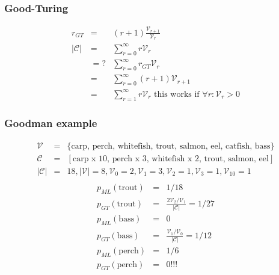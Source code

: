 \documentclass[ignorenonframetext]{beamer}
\newcommand{\vocab}{\mathcal{V}}
\newcommand{\corpus}{\mathcal{C}}
\begin{document}
\begin{frame}\frametitle{Good-Turing}
\begin{eqnarray*}
r_{GT} &=& (r+1)\frac{\vocab_{r+1}}{\vocab_{r}} \\
|\corpus| &=& \sum_{r=0}^\infty r\vocab_r \\
&=?& \sum_{r=0}^\infty r_{GT}\vocab_r \\
&=& \sum_{r=0}^\infty (r+1)\vocab_{r+1} \\
&=& \sum_{r=1}^\infty r \vocab_r  \mbox{  this works if  } \forall r : \vocab_r > 0
\end{eqnarray*}
\end{frame}

\begin{frame}\frametitle{Goodman example}
\begin{eqnarray*}
\vocab &=& \{ \mbox{carp, perch, whitefish, trout, salmon, eel,
  catfish, bass} \} \\
\corpus &=& [ \mbox{carp x 10, perch x 3, whitefish x 2, trout, salmon, eel} ] \\
|\corpus| &=& 18, |\vocab| = 8, \vocab_0=2, \vocab_1=3, \vocab_2=1, \vocab_3=1,
\vocab_{10}=1 \\
\end{eqnarray*}
\begin{eqnarray*}
p_{ML}(\mbox{trout}) &=& 1/18 \\
p_{GT}(\mbox{trout}) &=& \frac{2 \vocab_2 / \vocab_1}{|\corpus|} = 1/27 \\
p_{ML}(\mbox{bass}) &=& 0 \\
p_{GT}(\mbox{bass}) &=& \frac{ \vocab_1 / \vocab_0}{|\corpus|} = 1/12 \\
p_{ML}(\mbox{perch}) &=& 1/6 \\
p_{GT}(\mbox{perch}) &=& 0!!! \\
\end{eqnarray*}

\end{frame}
\end{document}
